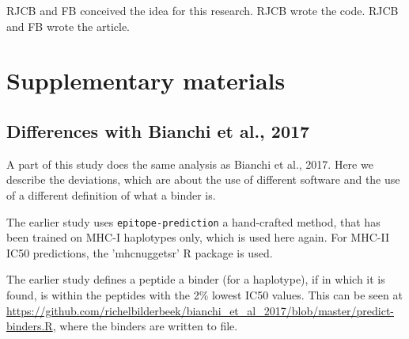 RJCB and FB conceived the idea for this research. 
RJCB wrote the code.
RJCB and FB wrote the article.





\appendix
\section{Supplementary materials}

\subsection{Differences with Bianchi et al., 2017}

A part of this study does the same analysis as Bianchi et al., 2017.
Here we describe the deviations, which are about the use of different
software and the use of a different definition of what a binder is.




The earlier study uses \verb;epitope-prediction; a hand-crafted method, 
that has been trained on MHC-I haplotypes only,
which is used here again. For MHC-II IC50 predictions, the
'mhcnuggetsr' R package is used.


The earlier study defines a peptide a binder (for a haplotype), 
if  in which it is found, 
is within the peptides with the 2\% lowest IC50 values.
This can be seen at \url{https://github.com/richelbilderbeek/bianchi_et_al_2017/blob/master/predict-binders.R},
where the binders are written to file.

